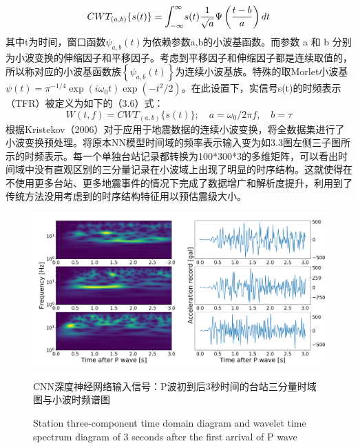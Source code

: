 \begin{equation}
C W T_{(a, b)}\{s(t)\}=\mathlarger{\int}_{-\infty}^{\infty} s(t) \frac{1}{\sqrt{a}} \Psi\left(\frac{t-b}{a}\right) d t
\end{equation}
其中t为时间，窗口函数$\psi_{a, b}(t)$为依赖参数a,b的小波基函数。而参数 a 和 b 分别为小波变换的伸缩因子和平移因子。考虑到平移因子和伸缩因子都是连续取值的，所以称对应的小波基函数族$\left\{\psi_{a, b}(t)\right\}$为连续小波基族。特殊的取Morlet小波基$\psi(t)=\pi^{-1 / 4} \exp \left(i \omega_{0} t\right) \exp \left(-t^{2} / 2\right)$。在此设置下，实信号s(t)的时频表示（TFR）被定义为如下的（3.6）式：\
\begin{equation}
W(t, f)=C W T_{(a, b)}\{s(t)\} ; \quad a=\omega_{0} / 2 \pi f,\quad  b=\tau
\end{equation}
\indent 根据Kristekov（2006）对于应用于地震数据的连续小波变换，将全数据集进行了小波变换预处理。将原本NN模型时间域的频率表示输入变为如3.3图左侧三子图所示的时频表示。每一个单独台站记录都转换为100*300*3的多维矩阵，可以看出时间域中没有直观区别的三分量记录在小波域上出现了明显的时序结构。这就使得在不使用更多台站、更多地震事件的情况下完成了数据增广和解析度提升，利用到了传统方法没用考虑到的时序结构特征用以预估震级大小。\\
\begin{figure}[h] 
\centering 
 \includegraphics[width=1.0\linewidth]{img/wavelet.jpg} 
 \renewcommand{\figurename}{图} 
\caption{CNN深度神经网络输入信号：P波初到后3秒时间的台站三分量时域图与小波时频谱图} 
\addtocounter{figure}{-1} \vspace{-5pt} 
\renewcommand{\figurename}{Fig} 
\caption{Station three-component time domain diagram and wavelet time spectrum diagram of 3 seconds after the first arrival of P wave} 
\renewcommand{\figurename}{图} 
\label{fig:network-device-influence.png} 
\end{figure}
